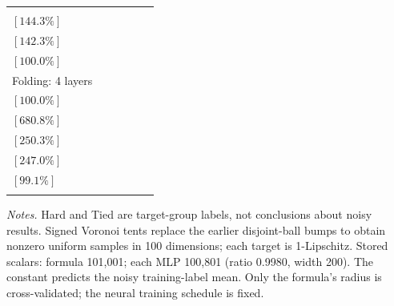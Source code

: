 \documentclass[10pt]{article}
\begin{document}
\begin{table}[t]
\begin{subtable}{\textwidth}
{\begin{tabular}{@{}lccccc@{}}
  \shortstack{$(1.740\pm 0.074)\times10^{-1}$\\$[144.3\%]$} &
  \shortstack{$(1.716\pm 0.125)\times10^{-1}$\\$[142.3\%]$} &
  \shortstack{$(1.206\pm 0.044)\times10^{-1}$\\$[100.0\%]$} \\
\addlinespace[3pt]
Folding: 4 layers &
  \shortstack{$(4.352\pm 0.187)\times10^{-2}$\\$[100.0\%]$} &
  \shortstack{$(2.963\pm 0.090)\times10^{-1}$\\$[680.8\%]$} &
  \shortstack{$(1.089\pm 0.032)\times10^{-1}$\\$[250.3\%]$} &
  \shortstack{$(1.075\pm 0.003)\times10^{-1}$\\$[247.0\%]$} &
  \shortstack{$(4.313\pm 0.132)\times10^{-2}$\\$[99.1\%]$} \\
\addlinespace[3pt]
\bottomrule
\end{tabular}%
}
\end{subtable}
\par\smallskip
\begin{minipage}{\textwidth}
\footnotesize
\emph{Notes.} Hard and Tied are target-group labels, not conclusions about noisy results. Signed Voronoi tents replace the earlier disjoint-ball bumps to obtain nonzero uniform samples in 100 dimensions; each target is 1-Lipschitz. Stored scalars: formula 101,001; each MLP 100,801 (ratio 0.9980, width 200). The constant predicts the noisy training-label mean. Only the formula's radius is cross-validated; the neural training schedule is fixed.
\end{minipage}
\end{table}

\clearpage
\end{document}
